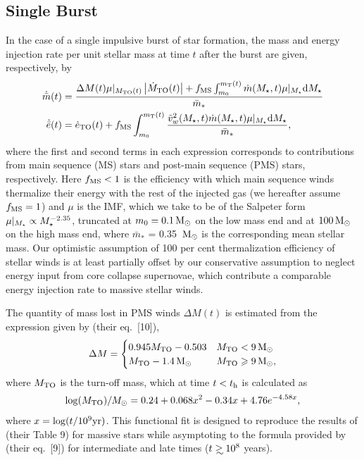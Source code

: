 
\subsection{Single Burst}

In the case of a single impulsive burst of star formation, the mass
and energy injection rate per unit stellar mass at time $t$ after the
burst are given, respectively, by
\begin{align} 
  \dot{\bar{m}}(t) &= \frac{\Delta M(t) \mu|_{M_{\rm TO}(t)}
    \left|\dot{M}_{\rm TO}(t)\right| + f_{\rm MS} \int_{m_0}^{m_{\rm
        T}(t)}
    \dot{m}(M_{\star}, t) \mu|_{M_{\star}} {\rm d}M_{\star} }{\bar{m}_*}\\
  \dot{\bar{e}}(t) &=\dot{e}_{\rm TO}(t)+ f_{\rm MS} \int_{m_0}^{m_{\rm T}(t)}
  \frac{\tilde{v}_{w}^2(M_{\star}, t) \dot{m}(M_{\star}, t) \mu|_{M_{\star}} {\rm d}M_{\star}}{\bar{m}_*},
  \label{eq:edotImp}
\end{align} 
where the first and second terms in each expression corresponds to
contributions from main sequence (MS) stars and post-main sequence
(PMS) stars, respectively.  Here $ f_{\rm MS} < 1$ is the efficiency
with which main sequence winds thermalize their energy with the rest
of the injected gas (we hereafter assume $f_{\rm MS} = 1$) and $\mu$
is the IMF, which we take to be of the Salpeter form $\mu|_{M_{\star}}
\propto M_{\star}^{-2.35}$, truncated at $m_0 = 0.1 \,{\rm M_\odot}$ on the low
mass end and at $100 \,{\rm M_\odot}$ on the high mass end, where $\bar{m}_*$ =
0.35 $\,{\rm M_\odot}$ is the corresponding mean stellar mass.  Our optimistic
assumption of 100 per cent thermalization efficiency of stellar winds
is at least partially offset by our conservative assumption to neglect
energy input from core collapse supernovae, which contribute a
comparable energy injection rate to massive stellar winds.

The quantity of mass lost in PMS winds $\Delta M(t)$ is estimated from
the expression given by \citet{CiottiOstriker:2007a} (their eq.~[10]),
\begin{align}
\Delta M=
\begin{cases}
0.945 M_{\rm TO}-0.503 & M_{\rm TO} < 9 \,{\rm M_\odot}\\
 M_{\rm TO}-1.4 \,{\rm M_\odot} &  M_{\rm TO} \geqslant 9 \,{\rm M_\odot},
\end{cases}
\end{align}
where $M_{\rm TO}$ is the turn-off mass, which at time $t < t_{\rm h}$ is calculated as
\begin{align}
\log(M_{\rm TO})/M_{\odot} =0.24 + 0.068 x^2-0.34 x+4.76 e^{-4.58 x},
\end{align}
where $x=\log(t/10^9 {\rm yr})$.  This functional fit is designed
to reproduce the results of \citet{MaederMeynet:1987a} (their Table 9)
for massive stars while asymptoting to the formula provided by
\citet{CiottiOstriker:2007a} (their eq.~[9]) for intermediate and late
times ($t \gsim 10^8$ years).

